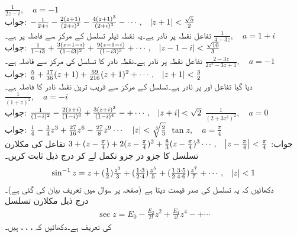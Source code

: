 \quad
$\tfrac{1}{2z-i},\quad a=-1$\\
جواب:\quad
$-\tfrac{1}{2+i}-\tfrac{2(z+1)}{(2+i)^2}-\tfrac{4(z+1)^3}{(2+i)^3}-\cdots, \quad \abs{z+1}<\tfrac{\sqrt{5}}{2}$\\
تفاعل  نقطہ  پر نادر ہے۔یہ نقطہ ٹیلر تسلسل کے مرکز  سے  فاصلہ پر ہے۔
\quad
$\tfrac{1}{4-3z},\quad a=1+i$\\
جواب:\quad
$\tfrac{1}{1-i3}+\tfrac{3(z-1-i)}{(1-i3)^2}+\tfrac{9(z-1-i)}{(1-i3)^3}+\cdots,\quad \abs{z-1-i}<\tfrac{\sqrt{10}}{3}$\\
تفاعل  نقطہ  پر نادر ہے۔نقطہ نادر کا تسلسل کی مرکز  سے فاصلہ  ہے۔
\quad
$\tfrac{2-3z}{2z^2-3z+1},\quad a=-1$\\
جواب:\quad
$\tfrac{5}{6}+\tfrac{17}{36}(z+1)+\tfrac{59}{216}(z+1)^2+\cdots,\quad \abs{z+1}<\tfrac{3}{2}$\\
دیا گیا تفاعل  اور  پر نادر ہے۔تسلسل کے مرکز سے قریب ترین نقطہ نادر کا فاصلہ  ہے۔ 
 \quad
$\tfrac{1}{(1+z)^2},\quad a=-i$\\
جواب:\quad
$\tfrac{1}{(1-i)^2}-\tfrac{2(z+i)}{(1-i)^3}+\tfrac{3(z+i)^2}{(1-i)^4}-+\cdots,\quad \abs{z+i}<\sqrt{2}$
\quad
$\tfrac{1}{(2+3z^3)^2},\quad a=0$\\
جواب:\quad
$\tfrac{1}{4}-\tfrac{3}{4}z^3+\tfrac{27}{16}z^6-\tfrac{27}{8}z^9\cdots\,\quad \abs{z}<\sqrt[\leftroot{-2}3]{\tfrac{2}{3}}$
\quad
$\tan z,\quad a=\tfrac{\pi}{4}$\\
جواب:\quad
$3+(z-\tfrac{\pi}{4})+2(z-\tfrac{\pi}{4})^2+\tfrac{8}{3}(z-\tfrac{\pi}{4})^3\cdots,\quad \abs{z-\tfrac{\pi}{4}}<\tfrac{\pi}{4}$
\quad
تفاعل  کی مکلارن تسلسل کا جزو در جزو تکمل لے کر درج ذیل ثابت کریں۔
\begin{align*}
\sin^{-1}z=z+(\tfrac{1}{2})\tfrac{z^3}{3}+(\tfrac{1\cdot 3}{2\cdot 4})\tfrac{z^5}{5}+(\tfrac{1\cdot 3\cdot 5}{2\cdot 4\cdot 6})\tfrac{z^7}{7}+\cdots,\quad \abs{z}<1
\end{align*}
دکھائیں کہ یہ تسلسل  کی صدر قیمت دیتا ہے (صفحہ  پر سوال  میں تعریف بیان کی گئی ہے)۔
\quad {}\\
درج ذیل مکلارن تسلسل
\begin{align}\label{مساوات_ٹیلر_یولر_اعداد_تعریف}
\sec z=E_0-\frac{E_2}{2!}z^2+\tfrac{E_4}{4!}z^4-+\cdots
\end{align}
  کی تعریف ہے۔دکھائیں کہ ، ، ،  ہیں۔

